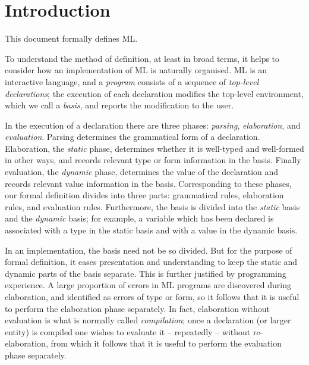 %
\section{Introduction}

This document formally defines  ML.

To understand the method of definition, at least in broad terms, it helps to
consider how an implementation of ML is naturally
organised.  ML is an interactive
language, 
and a {\sl program}  consists of a sequence of {\sl top-level
declarations}; the execution
of each declaration modifies the top-level environment, which we call
a {\sl basis}, and reports the modification to the user.

In the execution of a declaration there are three phases:
{\sl parsing}, {\sl elaboration}, and {\sl evaluation}.  
Parsing
determines the grammatical form of a declaration.  Elaboration, the
{\sl static} phase, determines whether it is well-typed and
well-formed in other ways, and records relevant type or form information
in the basis. Finally evaluation, the {\sl dynamic} phase, determines the
value of the declaration and records relevant value information in the
basis.  Corresponding to these phases, our formal definition divides
into three parts:  grammatical rules, elaboration rules, and evaluation
rules.  Furthermore, the basis is divided into the {\sl static} 
basis and the {\sl dynamic} basis; for example, a variable which has been
declared is associated with a type in the static basis and with a value in
the dynamic basis.

In an implementation, the basis need not be so divided.  But for the
purpose of formal definition, it eases presentation and understanding to
keep the static and dynamic parts of the basis separate.
This is further justified by programming experience.  A large proportion
of errors in ML programs are discovered during elaboration, and identified
as errors of type or form, so it follows that it is useful to perform
the elaboration phase separately.  In fact, elaboration without
evaluation is  what is normally called {\sl compilation};  
once
a declaration (or larger entity) is compiled one wishes to evaluate it --
repeatedly -- without re-elaboration, from which it follows that it is
useful to perform the evaluation phase separately.

